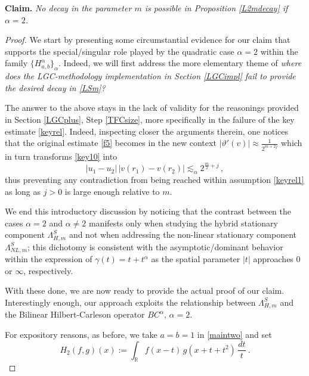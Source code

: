 \documentclass[a4paper,reqno]{amsart}
\numberwithin{equation}{section}
\theoremstyle{definition}
\newcommand{\R}{\mathbb{R}}
\def\a{\alpha}
\def\g{\gamma}
\def\L{\Lambda}
\begin{document}
\noindent\textbf{Claim.} \emph{No decay in the parameter $m$ is possible in Proposition \ref{L2mdecay} if $\a=2$.}

\begin{proof}

We start by presenting some circumstantial evidence for our claim that supports the special/singular role played by the quadratic case $\a=2$ within the family $\{H_{a,b}^{\a}\}_{\a}$. Indeed, we will first address the more elementary theme of \emph{where does the LGC-methodology implementation in Section \ref{LGCimpl} fail to provide the desired decay in \eqref{LSm}?}

The answer to the above stays in the lack of validity for the reasonings provided in Section \ref{LGCplus}, Step \ref{TFCsize}, more specifically in the failure of the key estimate \eqref{keyrel}. Indeed, inspecting closer the arguments therein, one notices that the original estimate \eqref{f5} becomes in the new context $|\vartheta'(v)|\approx \frac{1}{2^{m+2j}}$ which in turn transforms \eqref{key10} into
\begin{equation*}
|u_1-u_2|\,|v(r_1)-v(r_2)|\lesssim_{\a} 2^{\frac{m}{2}+j}\,,
\end{equation*}
thus preventing any contradiction from being reached within assumption \eqref{keyrel1} as long as $j>0$ is large enough relative to $m$. 

We end this introductory discussion by noticing that the contrast between the cases $\a=2$ and $\a\not=2$ manifests only when studying the hybrid stationary component $\L^{S}_{H,m}$ and not when addressing the non-linear stationary component $\L^{S}_{NL,m}$; this dichotomy is consistent with the asymptotic/dominant behavior within the expression of $\g(t)=t+ t^{\a}$ as the spatial parameter $|t|$ approaches $0$ or $\infty$, respectively.

With these done, we are now ready to provide the actual proof of our claim. Interestingly enough, our approach exploits the relationship between $\L^{S}_{H,m}$ and the Bilinear Hilbert-Carleson operator $BC^{\a}$, $\a=2$.
	
For expository reasons, as before, we take $a=b=1$ in \eqref{maintwo} and set
	\begin{equation}\label{bht20}
		H_{2}(f,g)(x):= \int_{\R} f(x-t)\, g(x+t+t^{2})\,\frac{dt}{t}\:.
	\end{equation}
	

\end{proof}
\end{document}
